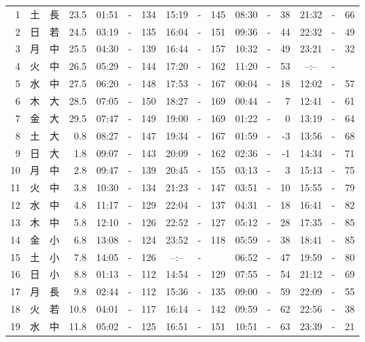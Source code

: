 \documentclass[12pt.a4j]{jsarticle}
\begin{document}
\begin{center}
\begin{table}[ht]
\begin{tabular}{|rc|cr|ccrccr|ccrccr|}
 \hline
 1 & 土 & 長 & 23.5 &  01:51 &-& 134  &  15:19 &-& 145  &   08:30 &-&  38  &   21:32 &-&  66  \\
 2 & 日 & 若 & 24.5 &  03:19 &-& 135  &  16:04 &-& 151  &   09:36 &-&  44  &   22:32 &-&  49  \\
 3 & 月 & 中 & 25.5 &  04:30 &-& 139  &  16:44 &-& 157  &   10:32 &-&  49  &   23:21 &-&  32  \\
 4 & 火 & 中 & 26.5 &  05:29 &-& 144  &  17:20 &-& 162  &   11:20 &-&  53  &   --:-- &-&     \\
 5 & 水 & 中 & 27.5 &  06:20 &-& 148  &  17:53 &-& 167  &   00:04 &-&  18  &   12:02 &-&  57  \\
 6 & 木 & 大 & 28.5 &  07:05 &-& 150  &  18:27 &-& 169  &   00:44 &-&   7  &   12:41 &-&  61  \\
 7 & 金 & 大 & 29.5 &  07:47 &-& 149  &  19:00 &-& 169  &   01:22 &-&   0  &   13:19 &-&  64  \\
 8 & 土 & 大 &  0.8 &  08:27 &-& 147  &  19:34 &-& 167  &   01:59 &-&  -3  &   13:56 &-&  68  \\
 9 & 日 & 大 &  1.8 &  09:07 &-& 143  &  20:09 &-& 162  &   02:36 &-&  -1  &   14:34 &-&  71  \\
10 & 月 & 中 &  2.8 &  09:47 &-& 139  &  20:45 &-& 155  &   03:13 &-&   3  &   15:13 &-&  75  \\
11 & 火 & 中 &  3.8 &  10:30 &-& 134  &  21:23 &-& 147  &   03:51 &-&  10  &   15:55 &-&  79  \\
12 & 水 & 中 &  4.8 &  11:17 &-& 129  &  22:04 &-& 137  &   04:31 &-&  18  &   16:41 &-&  82  \\
13 & 木 & 中 &  5.8 &  12:10 &-& 126  &  22:52 &-& 127  &   05:12 &-&  28  &   17:35 &-&  85  \\
14 & 金 & 小 &  6.8 &  13:08 &-& 124  &  23:52 &-& 118  &   05:59 &-&  38  &   18:41 &-&  85  \\
15 & 土 & 小 &  7.8 &  14:05 &-& 126  &  --:-- &-&     &   06:52 &-&  47  &   19:59 &-&  80  \\
16 & 日 & 小 &  8.8 &  01:13 &-& 112  &  14:54 &-& 129  &   07:55 &-&  54  &   21:12 &-&  69  \\
17 & 月 & 長 &  9.8 &  02:44 &-& 112  &  15:36 &-& 135  &   09:00 &-&  59  &   22:09 &-&  55  \\
18 & 火 & 若 & 10.8 &  04:01 &-& 117  &  16:14 &-& 142  &   09:59 &-&  62  &   22:56 &-&  38  \\
19 & 水 & 中 & 11.8 &  05:02 &-& 125  &  16:51 &-& 151  &   10:51 &-&  63  &   23:39 &-&  21  \\

\end{tabular}
\end{table}
\end{center}
\end{document}
